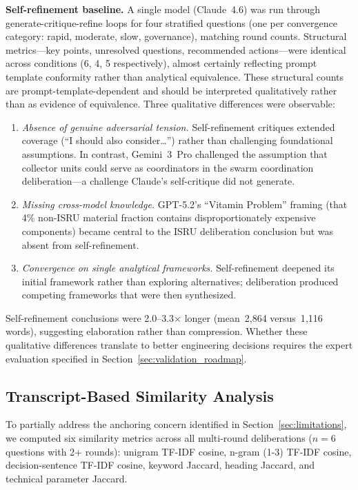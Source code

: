 \documentclass[11pt,a4paper]{article}
\begin{document}
\textbf{Self-refinement baseline.} A single model (Claude~4.6) was run through generate-critique-refine loops for four stratified questions (one per convergence category: rapid, moderate, slow, governance), matching round counts. Structural metrics---key points, unresolved questions, recommended actions---were identical across conditions (6, 4, 5 respectively), almost certainly reflecting prompt template conformity rather than analytical equivalence. These structural counts are prompt-template-dependent and should be interpreted qualitatively rather than as evidence of equivalence. Three qualitative differences were observable:

\begin{enumerate}[nosep]
    \item \emph{Absence of genuine adversarial tension.} Self-refinement critiques extended coverage (``I should also consider\ldots'') rather than challenging foundational assumptions. In contrast, Gemini~3~Pro challenged the assumption that collector units could serve as coordinators in the swarm coordination deliberation---a challenge Claude's self-critique did not generate.
    \item \emph{Missing cross-model knowledge.} GPT-5.2's ``Vitamin Problem'' framing (that 4\% non-ISRU material fraction contains disproportionately expensive components) became central to the ISRU deliberation conclusion but was absent from self-refinement.
    \item \emph{Convergence on single analytical frameworks.} Self-refinement deepened its initial framework rather than exploring alternatives; deliberation produced competing frameworks that were then synthesized.
\end{enumerate}

Self-refinement conclusions were 2.0--3.3$\times$ longer (mean~2{,}864 versus~1{,}116 words), suggesting elaboration rather than compression. Whether these qualitative differences translate to better engineering decisions requires the expert evaluation specified in Section~\ref{sec:validation_roadmap}.

\subsection{Transcript-Based Similarity Analysis}
\label{sec:similarity}

To partially address the anchoring concern identified in Section~\ref{sec:limitations}, we computed six similarity metrics across all multi-round deliberations ($n = 6$ questions with 2+ rounds): unigram TF-IDF cosine, n-gram (1-3) TF-IDF cosine, decision-sentence TF-IDF cosine, keyword Jaccard, heading Jaccard, and technical parameter Jaccard.
\end{document}
